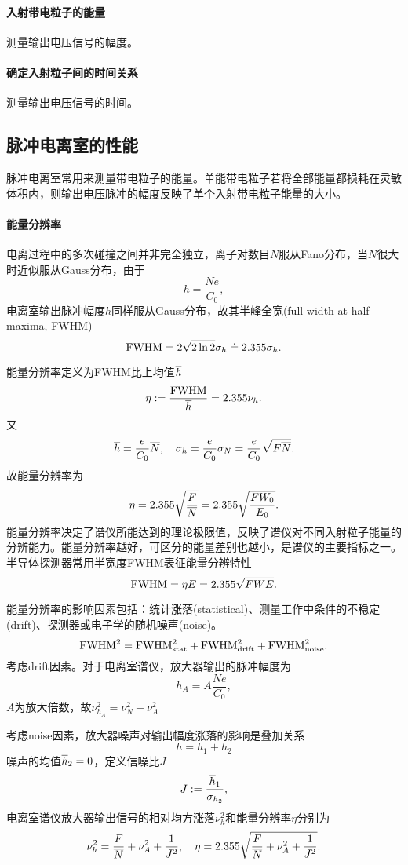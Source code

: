 \paragraph{入射带电粒子的能量}
测量输出电压信号的幅度。
\paragraph{确定入射粒子间的时间关系}
测量输出电压信号的时间。

\subsection{脉冲电离室的性能}

脉冲电离室常用来测量带电粒子的能量。单能带电粒子若将全部能量都损耗在灵敏体积内，则输出电压脉冲的幅度反映了单个入射带电粒子能量的大小。
\paragraph{能量分辨率}
电离过程中的多次碰撞之间并非完全独立，离子对数目$N$服从Fano分布，当$N$很大时近似服从Gauss分布，由于
\[
	h=\frac{Ne}{C_0},
\]
电离室输出脉冲幅度$h$同样服从Gauss分布，故其半峰全宽(full width at half maxima, FWHM)
\[
	\mathrm{FWHM}=2\sqrt{2\ln2}\sigma_h\doteq 2.355\sigma_h.
\]

能量分辨率定义为FWHM比上均值$\overline{h}$
\[
	\eta:=\frac{\mathrm{FWHM}}{\overline{h}}=2.355\nu_h.
\]
又
\[
	\overline{h}=\frac e{C_0}\overline{N},\quad\sigma_h=\frac e{C_0}\sigma_N=\frac e{C_0}\sqrt{F\overline{N}}.
\]
故能量分辨率为
\begin{align}
	\eta=2.355\sqrt{\frac{F}{\overline{N}}}=2.355\sqrt{\frac{FW_0}{E_0}}.
\end{align}
能量分辨率决定了谱仪所能达到的理论极限值，反映了谱仪对不同入射粒子能量的分辨能力。能量分辨率越好，可区分的能量差别也越小，是谱仪的主要指标之一。半导体探测器常用半宽度FWHM表征能量分辨特性
\[
	\mathrm{FWHM}=\eta E=2.355\sqrt{FWE}.
\]

能量分辨率的影响因素包括：统计涨落(statistical)、测量工作中条件的不稳定(drift)、探测器或电子学的随机噪声(noise)。
\[
	\mathrm{FWHM}^2=\mathrm{FWHM}_{\mathrm{stat}}^2+\mathrm{FWHM}_{\mathrm{drift}}^2+\mathrm{FWHM}_{\mathrm{noise}}^2.
\]
考虑drift因素。对于电离室谱仪，放大器输出的脉冲幅度为
\[
	h_A=A\frac{Ne}{C_0},
\]
$A$为放大倍数，故$\nu_{h_A}^2=\nu_N^2+\nu_A^2$

考虑noise因素，放大器噪声对输出幅度涨落的影响是叠加关系
\[
	h=h_1+h_2
\]
噪声的均值$\overline{h}_2=0$，定义信噪比$J$
\[
	J:=\frac{\overline{h}_1}{\sigma_{h_2}},
\]
电离室谱仪放大器输出信号的相对均方涨落$\nu_h^2$和能量分辨率$\eta$分别为
\[
	\nu_h^2=\frac F{\overline{N}}+\nu_A^2+\frac1{J^2},\quad \eta=2.355\sqrt{\frac F{\overline{N}}+\nu_A^2+\frac1{J^2}}.
\]
